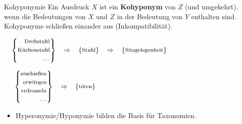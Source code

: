 \begin{frame}

\begin{block}{Kohyponymie}
Ein Ausdruck $X$ ist ein \textbf{Kohyponym} von $Z$ (und umgekehrt), wenn die Bedeutungen von $X$ und $Z$ in der Bedeutung von $Y$ enthalten sind. Kohyponyme schließen einander aus (Inkompatibilität).
\end{block}

\ea $$ \footnotesize
\left\{
\begin{aligned}
\text{Drehstuhl}\\
\text{Küchenstuhl}\\
\dots
\end{aligned} 
\right\} 
\quad \Rightarrow \quad
\left\{
\begin{aligned}
\text{Stuhl}\\
\end{aligned} 
\right\} 
\quad \Rightarrow \quad
\left\{
\begin{aligned}
\text{Sitzgelegenheit}\\
\end{aligned} 
\right\} \hspace{4cm}
$$

\ex $$ \footnotesize
\left\{
\begin{aligned}
\text{erschießen}\\
\text{erwürgen}\\
\text{erdrosseln}\\
\dots
\end{aligned}
\right\}
\quad \Rightarrow \quad
\left\{
\begin{aligned}
\text{töten}\\
\end{aligned}
\right\} \hspace{7.5cm}
$$

\z

\begin{itemize}
	\item Hyperonymie/Hyponymie bilden die Basis für Taxonomien.
\end{itemize}

\end{frame}


